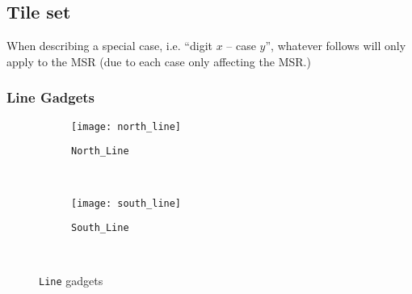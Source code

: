 \subsection{Tile set}
\label{gadgets}


\newcommand{\warpunit}{{\tt Warp\_Unit}}
\newcommand{\prewarp}{{\tt Pre\_Warp}}
\newcommand{\firstwarp}{{\tt First\_Warp}}
\newcommand{\warpbridge}{{\tt Warp\_Bridge}}
\newcommand{\secondwarp}{{\tt Second\_Warp}}
\newcommand{\postwarp}{{\tt Post\_Warp}}

\newcommand{\dtop}{{\tt Digit\_Top}}
\newcommand{\cwrite}{{\tt Counter\_Write}}
\newcommand{\cread}{{\tt Counter\_Read}}

\newcommand{\returnfromdonereadnextrow}{{\tt Return\_From\_Digit1\_Read\_Next\_Row}}
\newcommand{\returnfromdtworeadnextrow}{{\tt Return\_From\_Digit2\_Read\_Next\_Row}}
\newcommand{\returnfromdthreereadnextrow}{{\tt Return\_From\_Digit3\_Read\_Next\_Row}}

\newcommand{\returnfromdonereaddtwo}{{\tt Return\_From\_Digit1\_Read\_Digit2}}
\newcommand{\returnfromdonereaddtwocasetwo}{{\tt Return\_From\_Digit1\_Read\_Digit2\_Case2}}
\newcommand{\returnfromdtworeaddthree}{{\tt Return\_From\_Digit2\_Read\_Digit3}}
\newcommand{\returnfromdthreereaddone}{{\tt Return\_From\_Digit3\_Read\_Digit1}}

\newcommand{\inc}{ op}

\newcommand{\dtopdonecaseone}{{\tt Digit\_Top\_Digit1\_Case1}}
\newcommand{\dtopdonecasetwo}{{\tt Digit\_Top\_Digit1\_Case2}}
\newcommand{\dtopdtwocasetwo}{{\tt Digit\_Top\_Digit2\_Case2}}
\newcommand{\dtopcasethree}{{\tt Digit\_Top\_Case3}}

\newcommand{\gadgetref}{from the general gadget shown in Figure~}
\newcommand{\mgadgetref}{from the micro-gadget shown in Figure~}
\newcommand{\returnpath}{{\tt ReturnPath}}
\newcommand{\returnfromdigit}{{\tt Return\_From\_Digit}}
\newcommand{\readnext}{{\tt Next\_Read}}

When describing a special case, i.e. ``digit $x$ -- case $y$'', whatever follows
will only apply to the MSR (due to each case only affecting the MSR.)

\subsubsection{ Line Gadgets }

\begin{figure}[H]
    \centering
    \begin{subfigure}[t]{0.15\textwidth}
        \centering
        \texttt{[image: north\_line]}
        \caption{\label{fig:north_line} {\tt North\_Line}}
    \end{subfigure}%
    ~
    \begin{subfigure}[t]{0.15\textwidth}
        \centering
        \texttt{[image: south\_line]}
        \caption{\label{fig:south_line} {\tt South\_Line} }
    \end{subfigure}%
    ~
    \caption{\label{fig:line_gadgets} {\tt Line} gadgets}
\end{figure}

